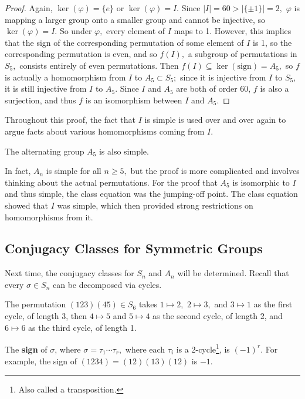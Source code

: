 \begin{proof}
Again, $\ker(\varphi) = \{e\}$ or $\ker(\varphi) = I.$ Since $|I| = 60 > |\{\pm 1\}| = 2,$ $\varphi$ is mapping a larger group onto a smaller group and cannot be injective, so $\ker(\varphi) = I.$ So under $\varphi,$ every element of $I$ maps to 1. However, this implies that the sign of the corresponding permutation of some element of $I$ is 1, so the corresponding permutation is even, and so $f(I),$ a subgroup of permutations in $S_5,$ consists entirely of even permutations. Then $f(I) \subseteq \ker(\text{sign}) = A_5,$ so $f$ is actually a homomorphism from $I$ to $A_5 \subset S_5;$ since it is injective from $I$ to $S_5,$ it is still injective from $I$ to $A_5.$ Since $I$ and $A_5$ are both of order 60, $f$ is also a surjection, and thus $f$ is an isomorphism between $I$ and $A_5$. 
\end{proof}

Throughout this proof, the fact that $I$ is simple is used over and over again to argue facts about various homomorphisms coming from $I.$

\begin{corollary}
The alternating group $A_5$ is also simple.
\end{corollary}

In fact, $A_n$ is simple for all $n \geq 5,$ but the proof is more complicated and involves thinking about the actual permutations. For the proof that $A_5$ is isomorphic to $I$ and thus simple, the class equation was the jumping-off point. The class equation showed that $I$ was simple, which then provided strong restrictions on homomorphisms from it. 

\subsection{Conjugacy Classes for Symmetric Groups}

Next time, the conjugacy classes for $S_n$ and $A_n$ will be determined. Recall that every $\sigma \in S_n$ can be decomposed via cycles. 
\begin{example}
The permutation $(123)(45) \in S_6$ takes $1 \mapsto 2,$ $2 \mapsto 3,$ and $3 \mapsto 1$ as the first cycle, of length 3, then $4 \mapsto 5$ and $5 \mapsto 4$ as the second cycle, of length 2, and $6 \mapsto 6$ as the third cycle, of length 1. 
\end{example}

The \textbf{sign} of $\sigma$, where $\sigma = \tau_1 \cdots \tau_r,$ where each $\tau_i$ is a 2-cycle\footnote{Also called a transposition.}, is $(-1)^r.$ For example, the sign of $(1234) = (12)(13)(12)$ is $-1.$ 

\newpage